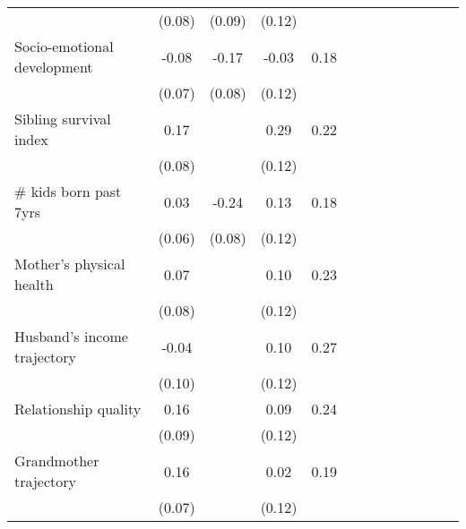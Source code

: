 {\begin{tabular}{l*{4}{SSc}}
          &   (0.08)&   (0.09)&   (0.12)&         \\
Socio-emotional development&    -0.08&    -0.17&    -0.03&     0.18\\
          &   (0.07)&   (0.08)&   (0.12)&         \\
Sibling survival index&     0.17&         &     0.29&     0.22\\
          &   (0.08)&         &   (0.12)&         \\
\# kids born past 7yrs&     0.03&    -0.24&     0.13&     0.18\\
          &   (0.06)&   (0.08)&   (0.12)&         \\
Mother's physical health&     0.07&         &     0.10&     0.23\\
          &   (0.08)&         &   (0.12)&         \\
Husband's income trajectory&    -0.04&         &     0.10&     0.27\\
          &   (0.10)&         &   (0.12)&         \\
Relationship quality&     0.16&         &     0.09&     0.24\\
          &   (0.09)&         &   (0.12)&         \\
Grandmother trajectory&     0.16&         &     0.02&     0.19\\
          &   (0.07)&         &   (0.12)&         \\
\bottomrule
\end{tabular}
}
